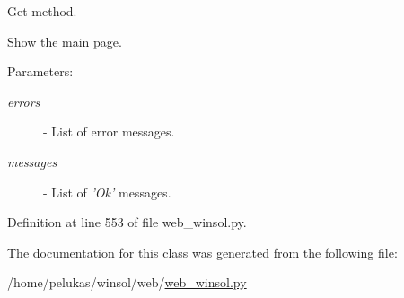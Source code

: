 Get method. 

Show the main page.

\begin{Desc}
\item[Parameters:]
\begin{description}
\item[{\em errors}]- List of error messages. \item[{\em messages}]- List of {\em 'Ok'\/} messages. \end{description}
\end{Desc}


Definition at line 553 of file web\_\-winsol.py.

The documentation for this class was generated from the following file:\begin{CompactItemize}
\item 
/home/pelukas/winsol/web/\hyperlink{web__winsol_8py}{web\_\-winsol.py}\end{CompactItemize}
